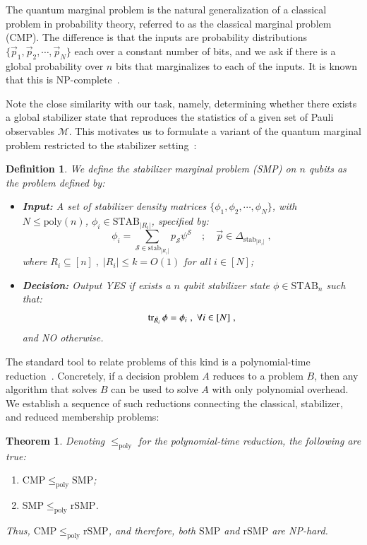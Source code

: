 \documentclass[10pt,aps,pra,twocolumn,floatfix,nofootinbib,superscriptaddress,longbibliography]{revtex4-2}
\newcommand{\1}{\mathbbm{1}}
\newtheorem{thm}{Theorem}
\newtheorem{defn}{Definition}
\begin{document}
The quantum marginal problem is the natural generalization of a classical problem in probability theory, referred to as the classical marginal problem (CMP). The difference is that the inputs are probability distributions $\{\vec p_1, \vec p_2, \cdots, \vec p_N\}$ each over a constant number of bits, and we ask if there is a global probability over $n$ bits that marginalizes to each of the inputs. It is known that this is NP-complete~\cite{pitowsky1989quantum, pitowsky1991correlation}.  

Note the close similarity with our task, namely, determining whether there exists a global stabilizer state that reproduces the statistics of a given set of Pauli observables $\mathcal{M}$. This motivates us to formulate a variant of the quantum marginal problem restricted to the stabilizer setting~\cite{hsieh2024resourcemarginal}:
\begin{defn}
    We define the stabilizer marginal problem (SMP) on $n$ qubits as the problem defined by:
    \begin{itemize}
        \item \textbf{Input: }A set of stabilizer density matrices $\{\phi_{1}, \phi_{2},\cdots, \phi_{N}\}$, with $N \leq \mathrm{poly}(n)$, $\phi_{i} \in \mathrm{STAB}_{|R_i|}$, specified by:
        \begin{equation}
            \phi_i =\sum_{\mathcal S \in \mathrm{stab}_{|R_i|}}p_\mathcal S\psi^\mathcal S \quad ;\quad \vec{p} \in \Delta_{\mathrm{stab}_{|R_i|}}\;,
        \end{equation}
        where $R_i \subseteq[n]\;,\; |R_i| \leq k=O(1)$ for all $i \in [N]$;
        \item \textbf{Decision: }Output YES if exists a $n$ qubit stabilizer state $\phi \in \mathrm{STAB}_n$ such that:
        \begin{equation}
            \tr_{\bar{R_i}}\phi =\phi_{i}\;,\;\forall i \in [N]\;,
        \end{equation}
        and NO otherwise.
    \end{itemize}
    \label{def:stabmargprob}
\end{defn}
The standard tool to relate problems of this kind is a polynomial-time reduction~\cite{arora2009computational}. Concretely, if a decision problem $A$ reduces to a problem $B$, then any algorithm that solves $B$ can be used to solve $A$ with only polynomial overhead. We establish a sequence of such reductions connecting the classical, stabilizer, and reduced membership problems:
\begin{thm}
    Denoting $\leq_\mathrm{poly}$ for the polynomial-time reduction, the following are true:
    \begin{enumerate}
        \item $\mathrm{CMP} \leq_\mathrm{poly}\mathrm{SMP}$;
        \item $\mathrm{SMP} \leq_\mathrm{poly} \mathrm{rSMP}$\;.
    \end{enumerate}
    Thus, $\mathrm{CMP} \leq_\mathrm{poly} \mathrm{rSMP}$, and therefore, both $\mathrm{SMP}$ and $\mathrm{rSMP}$ are NP-hard.
    \label{thm:CMPtorSMPreduction}
\end{thm}
\end{document}
